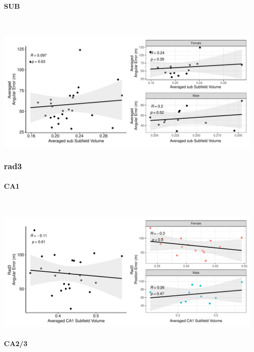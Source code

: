 \documentclass[
]{article}
\begin{document}
\paragraph{SUB}

~ \vspace{1cm}

\includegraphics{hippocampal_subfield_files/figure-latex/unnamed-chunk-7-1.pdf}

\newpage
\subsubsection{rad3}

\paragraph{CA1}

~ \vspace{1cm}

\includegraphics{hippocampal_subfield_files/figure-latex/unnamed-chunk-8-1.pdf}

\newpage
\paragraph{CA2/3}

~ \vspace{1cm}
\end{document}
